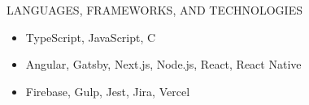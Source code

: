 \documentclass[]{mcdowellcv}
\begin{document}
	\begin{cvsection}{LANGUAGES, FRAMEWORKS, AND TECHNOLOGIES}
		\begin{cvsubsection}{}{}{}	
			\begin{itemize}
				\item TypeScript, JavaScript, C
				\item Angular, Gatsby, Next.js, Node.js, React, React Native
				\item Firebase, Gulp, Jest, Jira, Vercel
			\end{itemize}
		\end{cvsubsection}
	\end{cvsection}
	
\end{document}
